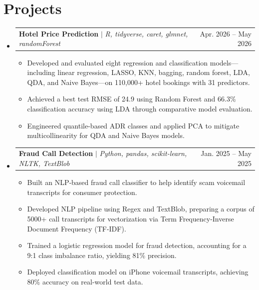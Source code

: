 \documentclass[letterpaper,11pt]{article}
\makeatletter
\newcommand{\resumeItem}[1]{
  \item\small{
    {#1 \vspace{-2pt}}
  }
}
\newcommand{\resumeProjectHeading}[2]{
    \item
    \begin{tabular*}{0.97\textwidth}{l@{\extracolsep{\fill}}r}
      \small#1 & #2 \\
    \end{tabular*}\vspace{-7pt}
}
\newcommand{\resumeSubHeadingListStart}{\begin{itemize}[leftmargin=0.15in, label={}]}
\newcommand{\resumeSubHeadingListEnd}{\end{itemize}}
\newcommand{\resumeItemListStart}{\begin{itemize}}
\newcommand{\resumeItemListEnd}{\end{itemize}\vspace{-5pt}}
\makeatother
\begin{document}

\section{Projects}
    \resumeSubHeadingListStart

        \resumeProjectHeading
          {\textbf{Hotel Price Prediction} $|$ \emph{R, tidyverse, caret, glmnet, randomForest}}{Apr. 2026 -- May 2026}
          \resumeItemListStart
                \resumeItem{Developed and evaluated eight regression and classification models—including linear regression, LASSO, KNN, bagging, random forest, LDA, QDA, and Naive Bayes—on 110,000+ hotel bookings with 31 predictors.}
                
                \resumeItem{Achieved a best test RMSE of 24.9 using Random Forest and 66.3\% classification accuracy using LDA through comparative model evaluation.}
                
                \resumeItem{Engineered quantile-based ADR classes and applied PCA to mitigate multicollinearity for QDA and Naive Bayes models.}
          \resumeItemListEnd
      
      \resumeProjectHeading
          {\textbf{Fraud Call Detection} $|$ \emph{Python, pandas, scikit-learn, NLTK, TextBlob}}{Jan. 2025 -- May 2025}
          \resumeItemListStart
          \resumeItem{Built an NLP‑based fraud call classifier to help identify scam voicemail transcripts for consumer protection.}
            \resumeItem{Developed NLP pipeline using Regex and TextBlob, preparing a corpus of 5000+ call transcripts for vectorization via Term Frequency-Inverse Document Frequency (TF-IDF).}
            \resumeItem{Trained a logistic regression model for fraud detection, accounting for a 9:1 class imbalance ratio, yielding 81\% precision.}
            \resumeItem{Deployed classification model on iPhone voicemail transcripts, achieving 80\% accuracy on real-world test data.}
          \resumeItemListEnd

    \resumeSubHeadingListEnd



%
\end{document}
